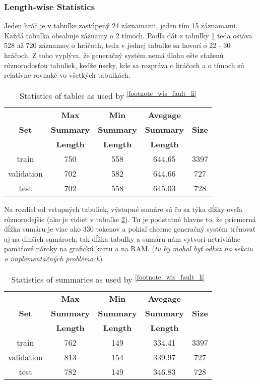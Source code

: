\subsubsection{Length-wise Statistics}

Jeden hráč je v tabuľke zastúpený 24 záznamami, jeden tím 15 záznamami. Každá tabuľka obsahuje záznamy o 2 tímoch. Podľa dát z tabuľky \ref{stats_tables_orig_rw} teda ostáva 528 až 720 záznamov o hráčoch, teda v jednej tabuľke sa hovorí o 22 - 30 hráčoch. Z toho vyplýva, že generačný systém nemá úlohu ešte sťaženú rôznorodosťou tabuliek, keďže úseky, kde sa rozpráva o hráčoch a o tímoch sú relatívne rovnaké vo všetkých tabuľkách.

\begin{table}[h!]
    \centering
    \begin{tabular}{ccccc}
        \toprule
        {}    & \textbf{Max} & \textbf{Min} & \textbf{Avegage}& {} \\
        \textbf{Set} & \textbf{Summary} & \textbf{Summary} & \textbf{Summary} & \textbf{Size} \\
        {} & \textbf{Length} & \textbf{Length} & \textbf{Length} & {} \\
        \midrule
        train      & 750 & 558 & 644.65 & 3397  \\
        validation & 702 & 582 & 644.66 & 727 \\
        test       & 702 & 558 & 645.03 & 728
    \end{tabular}
    \caption{Statistics of tables as used by \citep{wiseman2017}\textsuperscript{\ref{footnote_wis_fault_li}}} \label{stats_tables_orig_rw}
\end{table}

Na rozdiel od vstupných tabuliek, výstupné sumáre sú čo sa týka dĺžky oveľa rôznorodejšie (ako je vidieť v tabuľke \ref{stats_sums_orig_rw}). Tu je podstatné hlavne to, že priemerná dĺžka sumáru je viac ako 330 tokenov a pokiaľ chceme generačný systém trénovať aj na dlhších sumároch, tak dĺžka tabuľky a sumáru nám vytvorí netriviálne pamäťové nároky na grafickú kartu a na RAM. (\emph{tu by mohol byť odkaz na sekciu o implementačných problémoch})

\begin{table}[h!]
    \centering
    \begin{tabular}{ccccc}
        \toprule
        {}    & \textbf{Max} & \textbf{Min} & \textbf{Avegage}& {} \\
        \textbf{Set} & \textbf{Summary} & \textbf{Summary} & \textbf{Summary} & \textbf{Size} \\
        {} & \textbf{Length} & \textbf{Length} & \textbf{Length} & {} \\
        \midrule
        train      & 762 & 149 & 334.41 & 3397  \\
        validation & 813 & 154 & 339.97 & 727 \\
        test       & 782 & 149 & 346.83 & 728
    \end{tabular}
    \caption{Statistics of summaries as used by \citep{wiseman2017}\textsuperscript{\ref{footnote_wis_fault_li}}} \label{stats_sums_orig_rw}
\end{table}


